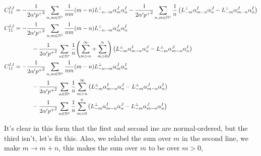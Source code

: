 \begin{align*}
    C_{11}^{IJ}&=-\frac{1}{2\alpha'{p^+}^2}\sum\limits_{n,m\in\mathbb N^\ast}\frac{1}{nm}\qty(m-n)L^\perp_{-n-m}\alpha^J_m\alpha^I_n-\frac{1}{2\alpha'{p^+}^2}\sum\limits_{n,m\in\mathbb N^\ast}\frac{1}{n}\left(L^\perp_{-m}\alpha^I_{m-n}\alpha^J_n-L^\perp_{-m}\alpha^J_{m-n}\alpha^I_n\right)\\
    C_{11}^{IJ}&=-\frac{1}{2\alpha'{p^+}^2}\sum\limits_{n,m\in\mathbb N^\ast}\frac{1}{nm}\qty(m-n)L^\perp_{-n-m}\alpha^J_m\alpha^I_n\\
    &\quad\quad\quad-\frac{1}{2\alpha'{p^+}^2}\sum\limits_{n\in\mathbb N^\ast}\frac{1}{n}\qty(\sum\limits_{m>n}^\infty+\sum\limits_{m>0}^{n})\left(L^\perp_{-m}\alpha^I_{m-n}\alpha^J_n-L^\perp_{-m}\alpha^J_{m-n}\alpha^I_n\right)\\
    C_{11}^{IJ}&=-\frac{1}{2\alpha'{p^+}^2}\sum\limits_{n,m\in\mathbb N^\ast}\frac{1}{nm}\qty(m-n)L^\perp_{-n-m}\alpha^J_m\alpha^I_n\\
    &\quad\quad\quad-\frac{1}{2\alpha'{p^+}^2}\sum\limits_{n\in\mathbb N^\ast}\frac{1}{n}\sum\limits_{m>n}^\infty\left(L^\perp_{-m}\alpha^I_{m-n}\alpha^J_n-L^\perp_{-m}\alpha^J_{m-n}\alpha^I_n\right)\\
    &\quad\quad\quad-\frac{1}{2\alpha'{p^+}^2}\sum\limits_{n\in\mathbb N^\ast}\frac{1}{n}\sum\limits_{m>0}^{n}\left(L^\perp_{-m}\alpha^I_{m-n}\alpha^J_n-L^\perp_{-m}\alpha^J_{m-n}\alpha^I_n\right)
\end{align*}

It's clear in this form that the first and second ine are normal-ordered, but the third isn't, let's fix this. Also, we relabel the sum over $m$ in the second line, 
we make $m\rightarrow m+n$, this makes the sum over $m$ to be over $m>0$,

